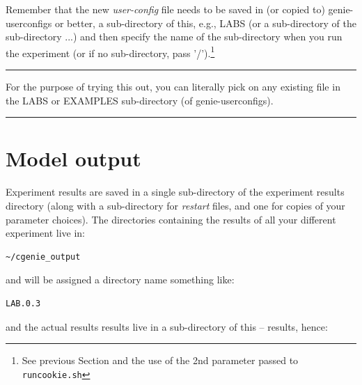 \noindent Remember that the new \textit{user-config} file needs to be saved in (or copied to) \textsf{\footnotesize genie-userconfigs} or better, a sub-directory of this, e.g., \textsf{\footnotesize LABS} (or a sub-directory of the sub-directory ...) and then specify the name of the sub-directory when you run the experiment (or if no sub-directory, pass '\textsf{\footnotesize /}').\footnote{See previous Section and the use of the 2nd parameter passed to \texttt{runcookie.sh}}

\vspace{1mm}\noindent\rule{4cm}{0.5pt}\vspace{2mm}

\noindent For the purpose of trying this out, you can literally pick on any existing file in the \textsf{\footnotesize LABS} or \textsf{\footnotesize EXAMPLES} sub-directory (of \textsf{\footnotesize genie-userconfigs}).

\vspace{1mm}\noindent\rule{4cm}{0.5pt}\vspace{2mm}

\newpage

\section{Model output}

Experiment results are saved in a single sub-directory of the experiment results directory (along with a sub-directory for \textit{restart} files, and one for copies of your parameter choices). The directories containing the results of all your different experiment live in:

\vspace{-1mm}\small\begin{verbatim}
~/cgenie_output
\end{verbatim}\normalsize\vspace{-1mm}
and will be assigned a directory name something like:

\vspace{-1mm}\small\begin{verbatim}
LAB.0.3
\end{verbatim}\normalsize\vspace{-1mm}
and the actual results results live in a sub-directory of this -- \textsf{\footnotesize results}, hence:


